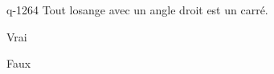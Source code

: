 \begin{truefalse}{q-1264}
Tout losange avec un angle droit est un carré.
\item* Vrai
\item Faux
\end{truefalse}

